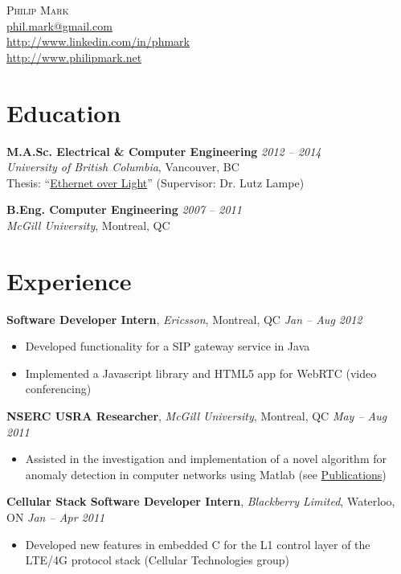 \documentclass[letterpaper]{article}
\newcommand{\contact}[4]{
  \begin{center}
    {\LARGE \textsc {#1}}\\ \smallskip
    {\href{mailto:#2}{#2}}\\ \smallskip
    {\url{#3}}\\ \smallskip
    {\url{#4}}\\ \medskip
  \end{center}
}
\newcommand{\jobtitle}[4]{
  \textbf{#1}, \emph{#2}, {#3} \hfill \emph{#4}\\
}
\newenvironment{jobdescription}{
  \vspace{-4pt}
  \begin{itemize}
  \setlength{\itemsep}{2pt}
  \setlength{\parskip}{0pt}
  \setlength{\parsep}{0pt}
}{\end{itemize}}
\begin{document}

\contact{Philip Mark}{phil.mark@gmail.com}{http://www.linkedin.com/in/phmark}
{http://www.philipmark.net}

\section*{Education}
\textbf{M.A.Sc. Electrical \& Computer Engineering}
\hfill \emph{2012 -- 2014}{} \\
\emph{University of British Columbia}, Vancouver, BC \\
Thesis: ``\href{http://circle.ubc.ca/handle/2429/51772}{Ethernet over Light}'' 
(Supervisor: Dr. Lutz Lampe) \\
\medskip 

\textbf{B.Eng. Computer Engineering} \hfill \emph{2007 -- 2011} \\
\emph{McGill University}, Montreal, QC \\

\bigskip

\section*{Experience}
\jobtitle{Software Developer Intern}{Ericsson}{Montreal, QC}{Jan -- Aug 2012}
\begin{jobdescription}
  \item Developed functionality for a SIP gateway service in Java
  \item Implemented a Javascript library and HTML5 app for WebRTC (video
  conferencing)
\end{jobdescription}

\jobtitle{NSERC USRA Researcher}{McGill University}{Montreal, QC}{May -- Aug
2011}
\begin{jobdescription}
  \item Assisted in the investigation and implementation of a novel
  algorithm for anomaly detection in computer networks using Matlab (see
  \hyperlink{sec:publications}{Publications})
\end{jobdescription}

\jobtitle{Cellular Stack Software Developer Intern}{Blackberry
Limited}{Waterloo, ON}{Jan -- Apr 2011}
\begin{jobdescription}
  \item Developed new features in embedded C for the L1 control layer of the
  LTE/4G protocol stack (Cellular Technologies group)
\end{jobdescription}
\end{document}
